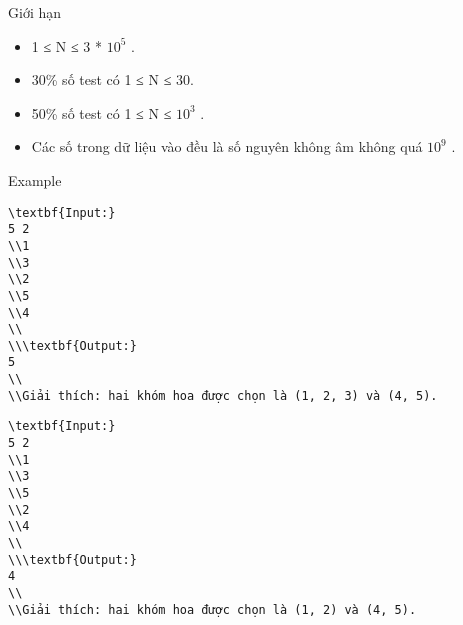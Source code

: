 Giới hạn  
\begin{itemize}
	\item     1 ≤ N ≤ 3 * $10^{5}$    .   
	\item     30\% số test có 1 ≤ N ≤ 30.   
	\item     50\% số test có 1 ≤ N ≤ $10^{3}$    .   
	\item     Các số trong dữ liệu vào đều là số nguyên không âm không quá $10^{9}$    .   
\end{itemize}
   Example  
\begin{verbatim}
\textbf{Input:}
5 2
\\1 
\\3 
\\2 
\\5 
\\4
\\
\\\textbf{Output:}
5
\\
\\Giải thích: hai khóm hoa được chọn là (1, 2, 3) và (4, 5).\end{verbatim}
\begin{verbatim}
\textbf{Input:}
5 2
\\1 
\\3 
\\5 
\\2 
\\4
\\
\\\textbf{Output:}
4
\\
\\Giải thích: hai khóm hoa được chọn là (1, 2) và (4, 5).\end{verbatim}